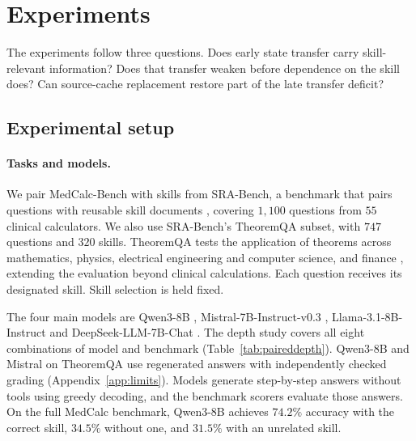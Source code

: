\section{Experiments}
\label{sec:experiments}

The experiments follow three questions. Does early state transfer carry
skill-relevant information? Does that transfer weaken before dependence
on the skill does? Can source-cache replacement restore part of the late
transfer deficit?

\subsection{Experimental setup}
\label{sec:setup}
\label{sec:cells}

\paragraph{Tasks and models.}
We pair MedCalc-Bench \citep{khandekar2024medcalc} with skills from
SRA-Bench, a benchmark that pairs questions with reusable skill documents
\citep{su2026srabench}, covering $1{,}100$ questions from $55$
clinical calculators. We also use SRA-Bench's TheoremQA subset, with $747$
questions and $320$ skills. TheoremQA tests the application of theorems
across mathematics, physics, electrical engineering and computer science,
and finance \citep{chen2023theoremqa}, extending the evaluation beyond
clinical calculations. Each question receives its designated skill.
Skill selection is held fixed.

The four main models are Qwen3-8B \citep{yang2025qwen3},
Mistral-7B-Instruct-v0.3 \citep{jiang2023mistral}, Llama-3.1-8B-Instruct
\citep{grattafiori2024llama3} and DeepSeek-LLM-7B-Chat
\citep{deepseek2024llm}. The depth study covers all eight combinations of
model and benchmark (Table~\ref{tab:paireddepth}). Qwen3-8B and Mistral on
TheoremQA use regenerated answers with independently checked grading
(Appendix~\ref{app:limits}).
Models generate step-by-step answers without tools using greedy decoding,
and the benchmark scorers evaluate those answers. On the full MedCalc benchmark, Qwen3-8B
achieves $74.2\%$ accuracy with the correct skill, $34.5\%$ without one,
and $31.5\%$ with an unrelated skill.

